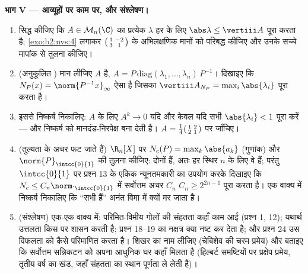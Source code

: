 \begin{problem}
\medskip
\noindent\textbf{भाग V --- आव्यूहों पर  काम पर, और संश्लेषण।}
\begin{enumerate}[resume]
  \item सिद्ध कीजिए कि $A \in
        \mathcal{M}_n(\C)$ का प्रत्येक  $\lambda$ हर  के लिए $\abs\lambda \leq
        \vertiii A$ पूरा करता है; \cref{exo:b2:nvs:4} लगाकर
        $\begin{psmallmatrix}1 & -2\\ 3 & 1\end{psmallmatrix}$
        के अभिलक्षणिक मानों को परिबद्ध कीजिए और उनके सच्चे मापांक से
        तुलना कीजिए।
  \item (अनुकूलित ) मान लीजिए $A$  है, $A =
        P\,\mathrm{diag}(\lambda_1, \dots, \lambda_n)\,P^{-1}$। दिखाइए कि
        $N_P(x) = \norm{P^{-1}x}_\infty$ ऐसा  है जिसका  $\vertiii A_{N_P} =
        \max_i\abs{\lambda_i}$ पूरा करता है।
  \item इससे निष्कर्ष निकालिए:  $A$ के लिए $A^k \to 0$ यदि और केवल
        यदि सभी  $\abs{\lambda_i} < 1$ पूरा करें --- और  निष्कर्ष को मानदंड-निरपेक्ष बना देती है। $A =
        \frac14\begin{psmallmatrix}1 & 2\\ 2 &
        1\end{psmallmatrix}$ पर
        जाँचिए।
  \item (तुल्यता के अचर फट जाते हैं) $\R_n[X]$ पर $N_c(P) = \max_k \abs{a_k}$ (गुणांक) और $\norm{P}_{\intcc{0}{1}}$ की
        तुलना कीजिए: दोनों  हैं, अतः हर स्थिर $n$ के लिए वे
         हैं; परंतु $\intcc{0}{1}$ पर प्रश्न 13 के एकिक न्यूनतमकारी का उपयोग
        करके दिखाइए कि $N_c \leq
        C_n\norm\cdot_{\intcc{0}{1}}$ में सर्वोत्तम अचर $C_n$ $C_n \geq
        2^{2n-1}$ पूरा करता है।
        एक वाक्य में निष्कर्ष निकालिए कि ``सभी   हैं'' अनंत
        विमा में क्यों मर जाता है।
  \item (संश्लेषण) एक-एक वाक्य में: परिमित-विमीय गोलों की संहतता कहाँ
        काम आई (प्रश्न 1, 12); यथार्थ उत्तलता किस पर शासन करती है;
        प्रश्न 18--19 का नक्षत्र क्या नष्ट कर देता है; और प्रश्न 24 उस
        विफलता को कैसे परिमाणित करता है। शिखर का नाम लीजिए (चेबिशेव की
        चरम प्रमेय) और बताइए कि सर्वोत्तम सन्निकटन को अपना आधुनिक घर
        कहाँ मिलता है (हिल्बर्ट समष्टियों पर प्रक्षेप प्रमेय, तृतीय
        वर्ष का खंड, जहाँ संहतता का स्थान पूर्णता ले लेती है)।
\end{enumerate}
\end{problem}
